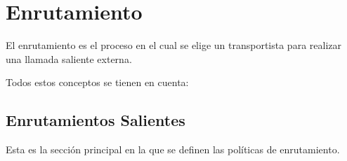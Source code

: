 \documentclass[letterpaper,10pt,spanish]{sphinxmanual}
\begin{document}
\section{Enrutamiento}
\label{administration_portal/brand/routing/index::doc}\label{administration_portal/brand/routing/index:routing}
El enrutamiento es el proceso en el cual se elige un transportista para realizar una llamada saliente externa.

Todos estos conceptos se tienen en cuenta:
\label{administration_portal/brand/routing/outgoing_routings:routes-weights}

\subsection{Enrutamientos Salientes}
\label{administration_portal/brand/routing/outgoing_routings:routes-weights}\label{administration_portal/brand/routing/outgoing_routings:id1}\label{administration_portal/brand/routing/outgoing_routings::doc}\label{administration_portal/brand/routing/outgoing_routings:outgoing-routings}
Esta es la sección principal en la que se definen las políticas de enrutamiento.
\end{document}
